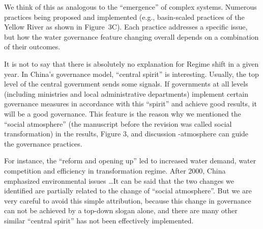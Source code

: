 \AR*{} We think of this as analogous to the ``emergence'' of complex systems. Numerous practices being proposed and implemented (e.g., basin-scaled practices of the Yellow River as shown in Figure~3C). Each practice addresses a specific issue, but how the water governance feature changing overall depends on a combination of their outcomes.

\AR*{} It is not to say that there is absolutely no explanation for Regime shift in a given year. In China's governance model, ``central spirit'' is interesting. Usually, the top level of the central government sends some signals. If governments at all levels (including ministries and local administrative departments) implement certain governance measures in accordance with this ``spirit'' and achieve good results, it will be a good governance. This feature is the reason why we mentioned the ``social atmosphere'' (the manuscript before the revision was called social transformation) in the results, Figure 3, and discussion -atmosphere can guide the governance practices.

\AR*{} For instance, the ``reform and opening up'' led to increased water demand, water competition and efficiency in transformation regime. After 2000, China emphasized environmental issues \dots It can be said that the two changes we identified are partially related to the change of ``social atmosphere''. But we are very careful to avoid this simple attribution, because this change in governance can not be achieved by a top-down slogan alone, and there are many other similar ``central spirit'' has not been effectively implemented.

